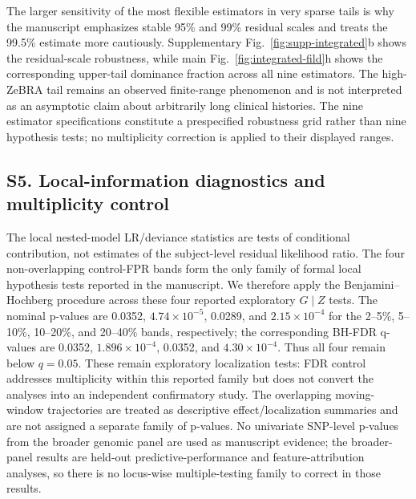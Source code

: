 The larger sensitivity of the most flexible estimators in very sparse tails is why the manuscript emphasizes stable 95\% and 99\% residual scales and treats the 99.5\% estimate more cautiously. Supplementary Fig.~\ref{fig:supp-integrated}b shows the residual-scale robustness, while main Fig.~\ref{fig:integrated-fild}h shows the corresponding upper-tail dominance fraction across all nine estimators. The high-ZeBRA tail remains an observed finite-range phenomenon and is not interpreted as an asymptotic claim about arbitrarily long clinical histories. The nine estimator specifications constitute a prespecified robustness grid rather than nine hypothesis tests; no multiplicity correction is applied to their displayed ranges.

\subsection*{S5. Local-information diagnostics and multiplicity control}
The local nested-model LR/deviance statistics are tests of conditional contribution, not estimates of the subject-level residual likelihood ratio. The four non-overlapping control-FPR bands form the only family of formal local hypothesis tests reported in the manuscript. We therefore apply the Benjamini--Hochberg procedure across these four reported exploratory $G\mid Z$ tests. The nominal p-values are 0.0352, $4.74\times10^{-5}$, 0.0289, and $2.15\times10^{-4}$ for the 2--5\%, 5--10\%, 10--20\%, and 20--40\% bands, respectively; the corresponding BH-FDR q-values are 0.0352, $1.896\times10^{-4}$, 0.0352, and $4.30\times10^{-4}$. Thus all four remain below $q=0.05$. These remain exploratory localization tests: FDR control addresses multiplicity within this reported family but does not convert the analyses into an independent confirmatory study. The overlapping moving-window trajectories are treated as descriptive effect/localization summaries and are not assigned a separate family of p-values. No univariate SNP-level p-values from the broader genomic panel are used as manuscript evidence; the broader-panel results are held-out predictive-performance and feature-attribution analyses, so there is no locus-wise multiple-testing family to correct in those results.

